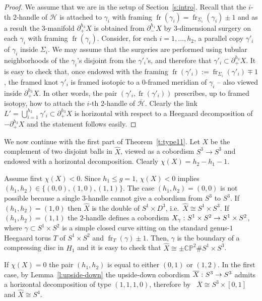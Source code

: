 \documentclass[11pt,a4paper]{amsart}
\newcommand{\CP}{\mathbb{CP}}
\newcommand{\ga}{\gamma}
\newcommand{\Si}{\Sigma}
\newcommand{\x}{\times}
\newcommand{\del}{\partial}
\renewcommand{\H}{\mathcal H}
\newcommand{\co}{\thinspace\colon}
\DeclareMathOperator{\fr}{fr}
\theoremstyle{definition}
\numberwithin{equation}{section}
\begin{document}
\begin{proof}
We assume that we are in the setup of Section~\ref{s:intro}. 
Recall that the $i$-th $2$-handle of $\H$ is attached to $\ga_i$ 
with framing $\fr(\ga_i) = \fr_{\Si_i}(\ga_i)\pm 1$ and as a result the $3$-manifold 
$\del_+^{h_3} X$ is obtained from $\del_-^{h_1} X$ by $3$-dimensional 
surgery on each $\ga_i$ with framing $\fr(\ga_i)$. Consider, for each $i=1,\ldots, h_2$, 
a parallel copy $\ga'_i$ of $\ga_i$ inside $\Si_i$. We may assume that the surgeries 
are performed 
using tubular neighborhoods of the $\ga_i$'s disjoint from the $\ga'_i$'s, and therefore 
that $\ga'_i\subset \del_+^{h_3} X$. It is easy to check that, once endowed with the 
framing $\fr(\ga'_i) := \fr_{\Si_i}(\ga'_i)\mp 1$, the framed knot $\ga'_i$ is framed isotopic
to a $0$-framed meridian of $\ga_i$ -- also viewed inside $\del_+^{h_3} X$. In other 
words, the pair $(\ga'_i,\fr(\ga'_i))$ prescribes, up to framed isotopy, 
how to attach the $i$-th $2$-handle of $\overline{\H}$. Clearly the link 
$L' = \bigcup_{i=1}^{h_2} \ga'_i\subset\del_+^{h_3} X$ is horizontal with respect to 
a Heegaard decomposition of $-\del_+^{h_3} X$ and the statement follows easily.
\end{proof}

We now continue with the first part of Theorem~\ref{t:type11}. 
Let $X$ be the complement of two disjoint balls in $\hat X$, viewed as a cobordism $S^3\to S^3$ and endowed with a horizontal decomposition. 
Clearly $\chi(X) = h_2 - h_1 - 1$. 


Assume first $\chi(X)<0$. Since $h_1\leq g=1$, $\chi(X)<0$ implies $(h_1,h_2)\in\{(0,0),(1,0),(1,1)\}$. 
The case $(h_1,h_2)=(0,0)$ is not possible because a single $3$-handle cannot give a cobordism from $S^3$ to $S^3$. 
If $(h_1,h_2) = (1,0)$ then $\hat X$ is the double of $S^1\x D^3$, i.e.~$\hat X\cong S^1\x S^3$.  
If $(h_1,h_2) = (1,1)$ the $2$-handle defines a cobordism $X_\ga\co S^1\x S^2\to S^1\x S^2$, where $\ga\subset S^1\x S^2$ is a simple closed curve sitting on the standard genus-$1$ Heegaard torus $T$ of $S^1\x S^2$ and $\fr_T(\ga)\pm 1$. 
Then, $\ga$ is the boundary of a compressing disc in $H_1$ and it is easy to check that $\hat X\cong \pm\CP^2\# S^1\x S^3$. 

If $\chi(X)=0$ the pair $(h_1,h_2)$ is equal to either $(0,1)$ or $(1,2)$.  
In the first case, by Lemma~\ref{l:upside-down} the upside-down cobordism $\overline{X}\co S^3\to S^3$ admits a horizontal decomposition of type $(1,1,1,0)$, therefore by~\cite[Theorem~1]{LP22-2} $\overline{X}\cong S^3\x [0,1]$ and $\hat X\cong S^4$. 
\end{document}
